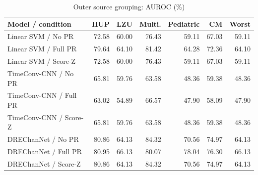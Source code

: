 \begin{table}[t]
\centering
\caption{Outer source grouping: AUROC (\%)}
\small
\begin{tabular}{lrrrrrr}
\toprule
Model / condition & HUP & LZU & Multi. & Pediatric & CM & Worst \\
\midrule
Linear SVM / No PR & 72.58 & 60.00 & 76.43 & 59.11 & 67.03 & 59.11 \\
Linear SVM / Full PR & 79.64 & 64.10 & 81.42 & 64.28 & 72.36 & 64.10 \\
Linear SVM / Score-Z & 72.58 & 60.00 & 76.43 & 59.11 & 67.03 & 59.11 \\
TimeConv-CNN / No PR & 65.81 & 59.76 & 63.58 & 48.36 & 59.38 & 48.36 \\
TimeConv-CNN / Full PR & 63.02 & 54.89 & 66.57 & 47.90 & 58.09 & 47.90 \\
TimeConv-CNN / Score-Z & 65.81 & 59.76 & 63.58 & 48.36 & 59.38 & 48.36 \\
DREChanNet / No PR & 80.86 & 64.13 & 84.32 & 70.56 & 74.97 & 64.13 \\
DREChanNet / Full PR & 80.95 & 66.13 & 80.07 & 78.04 & 76.30 & 66.13 \\
DREChanNet / Score-Z & 80.86 & 64.13 & 84.32 & 70.56 & 74.97 & 64.13 \\
\bottomrule
\end{tabular}
\end{table}
